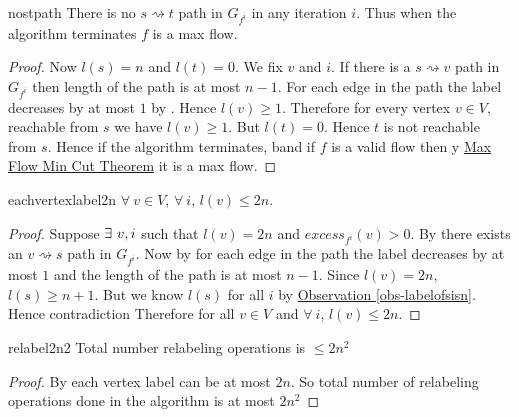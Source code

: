 \begin{corolary}{}{nostpath}
	There is no $s\rightsquigarrow t$ path in $G_{f^i}$ in any iteration $i$. Thus when the algorithm terminates $f$ is a max flow.
\end{corolary}
\begin{proof}
	Now $l(s)=n$ and $l(t)=0$. We fix $v$ and $i$. If there is a $s\rightsquigarrow v$ path in $G_{f^i}$ then length of the path is at most $n-1$. For each edge in the path the label decreases by at most $1$ by . Hence $l(v)\geq 1$. Therefore for every vertex $v\in V$, reachable from $s$ we have $l(v)\geq 1$. But $l(t)=0$. Hence $t$ is not reachable from $s$. 	Hence if the algorithm terminates, band if $f$ is a valid flow then y \hyperref[th:maxflowmincut]{Max Flow Min Cut Theorem}  it is a max flow.
\end{proof}
\begin{corolary}{}{eachvertexlabel2n}
	$\forall\ v\in V$, $\forall\ i$, $l(v)\leq 2n$.
\end{corolary}
\begin{proof}
	Suppose $\exists\ v,i$ such that $l(v)=2n$ and $\textit{excess}_{f^i}(v)>0$. By  there exists an $v\rightsquigarrow s$ path in $G_{f^i}$. Now by  for each edge in the path the label decreases by at most $1$ and the length of the path is at most $n-1$. Since $l(v)=2n$, $l(s)\geq n+1$. But we know $l(s)$ for all $i$ by \hyperref[obs-labelofsisn]{Observation \ref{obs-labelofsisn}}. Hence contradiction \ctr Therefore for all $v\in V$ and $\forall\ i$, $l(v)\leq 2n$.
\end{proof}

\begin{corolary}{}{relabel2n2}
	Total number relabeling operations is $\leq 2n^2$
\end{corolary}
\begin{proof}
	By  each vertex label can be at most $2n$. So total number of relabeling operations done in the algorithm is at most $2n^2$
\end{proof}

